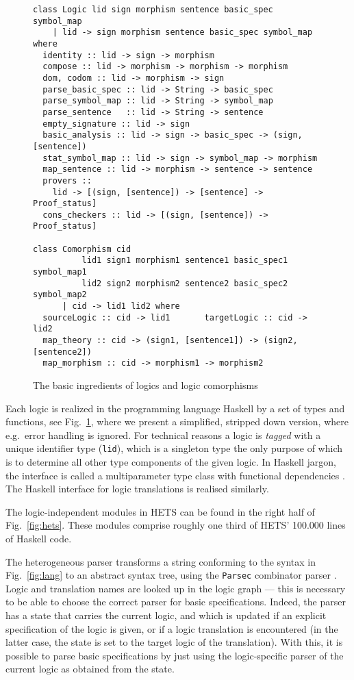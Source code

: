 \documentclass{article}
\newcommand{\normalTEXTSC}[2]{{#1\scriptsize#2}}
\newcommand     {\Hets}{\normalTEXTSC{H}{ETS}\xspace}
\begin{document}
\begin{figure}
\begin{center}
{\small
\begin{verbatim}
class Logic lid sign morphism sentence basic_spec symbol_map
    | lid -> sign morphism sentence basic_spec symbol_map where
  identity :: lid -> sign -> morphism
  compose :: lid -> morphism -> morphism -> morphism
  dom, codom :: lid -> morphism -> sign
  parse_basic_spec :: lid -> String -> basic_spec
  parse_symbol_map :: lid -> String -> symbol_map
  parse_sentence   :: lid -> String -> sentence
  empty_signature :: lid -> sign
  basic_analysis :: lid -> sign -> basic_spec -> (sign, [sentence])
  stat_symbol_map :: lid -> sign -> symbol_map -> morphism
  map_sentence :: lid -> morphism -> sentence -> sentence
  provers ::
    lid -> [(sign, [sentence]) -> [sentence] -> Proof_status]
  cons_checkers :: lid -> [(sign, [sentence]) -> Proof_status]

class Comorphism cid
          lid1 sign1 morphism1 sentence1 basic_spec1 symbol_map1
          lid2 sign2 morphism2 sentence2 basic_spec2 symbol_map2
      | cid -> lid1 lid2 where
  sourceLogic :: cid -> lid1       targetLogic :: cid -> lid2
  map_theory :: cid -> (sign1, [sentence1]) -> (sign2, [sentence2])
  map_morphism :: cid -> morphism1 -> morphism2
\end{verbatim}
}
\end{center}
\caption{The basic ingredients of logics and logic comorphisms}
\label{fig:logic:all}
\end{figure}

Each logic is realized in the programming language Haskell
\cite{PeytonJones03} by a set of types and functions, see
Fig.~\ref{fig:logic:all}, where we present a simplified, stripped down
version, where e.g.\ error handling is ignored. For technical reasons
a logic is \emph{tagged} with a unique identifier type (\texttt{lid}),
which is a singleton type the only purpose of which is to determine
all other type components of the given logic.  In Haskell jargon, the
interface is called a multiparameter type class with functional
dependencies \cite{TypeClasses}.  The Haskell interface for logic
translations is realised similarly.


The logic-independent modules in \Hets can be found in the right half
of Fig.~\ref{fig:hets}.  These modules comprise roughly one third of
\Hets' 100.000 lines of Haskell code.

The heterogeneous parser transforms a string
conforming to the syntax in Fig.~\ref{fig:lang}
to an abstract syntax tree, using the \texttt{Parsec} combinator parser
\cite{Parsec}.  Logic and translation names are looked up in the logic
graph --- this is necessary to be able to choose the correct parser
for basic specifications.  Indeed, the parser has a state that carries
the current logic, and which is updated if an explicit specification
of the logic is given, or if a logic translation is encountered (in
the latter case, the state is set to the target logic of the
translation).  With this, it is possible to parse basic specifications
by just using the logic-specific parser of the current logic as
obtained from the state.
\end{document}
